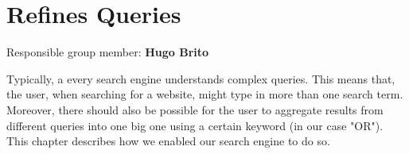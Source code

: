 \chapter{Refines Queries}



Responsible group member: \textbf{Hugo Brito}

Typically, a every search engine understands complex queries. This means that, the user, when searching for a website, might type in more than one search term. Moreover, there should also be possible for the user to aggregate results from different queries into one big one using a certain keyword (in our case "OR").
This chapter describes how we enabled our search engine to do so.

